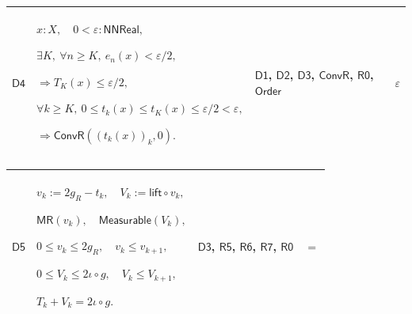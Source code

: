 \documentclass[11pt]{amsart}
\newlength{\FTCFourColumnBody}
\begin{document}
{\noindent
\begin{tabular}{|@{}>{\centering\arraybackslash}m{0.078431\FTCFourColumnBody}|>{\centering\arraybackslash}m{0.535947\FTCFourColumnBody}|>{\centering\arraybackslash}m{0.281045\FTCFourColumnBody}|>{\centering\arraybackslash}m{0.104575\FTCFourColumnBody}|}\hline
\hypertarget{dct:D4}{$\displaystyle \textsf{D4}$} & $\displaystyle x:X,\quad0<\varepsilon:\textsf{NNReal},$\par
$\displaystyle \exists K,\ \forall n\ge K,\ e_n(x)<\varepsilon/2,$\par
$\displaystyle \Rightarrow T_K(x)\le\varepsilon/2,$\par
$\displaystyle \forall k\ge K,\ 0\le t_k(x)\le t_K(x)\le\varepsilon/2<\varepsilon,$\par
$\displaystyle \Rightarrow\textsf{ConvR}((t_k(x))_k,0).$ & \hyperlink{dct:D1}{$\displaystyle \textsf{D1}$}, \hyperlink{dct:D2}{$\displaystyle \textsf{D2}$}, \hyperlink{dct:D3}{$\displaystyle \textsf{D3}$}, \hyperlink{dctdef:ConvR}{$\displaystyle \textsf{ConvR}$}, \hyperlink{dct:R0}{$\displaystyle \textsf{R0}$}, \hyperlink{ax:Order}{$\displaystyle \textsf{Order}$} & $\displaystyle \varepsilon$\\ \hline
\end{tabular}%
\par\setlength{\parskip}{0pt}\nointerlineskip
\noindent
\begin{tabular}{|@{}>{\centering\arraybackslash}m{0.078431\FTCFourColumnBody}|>{\centering\arraybackslash}m{0.535947\FTCFourColumnBody}|>{\centering\arraybackslash}m{0.281045\FTCFourColumnBody}|>{\centering\arraybackslash}m{0.104575\FTCFourColumnBody}|}\hline
\hypertarget{dct:D5}{$\displaystyle \textsf{D5}$} & $\displaystyle v_k:=2g_R-t_k,\quad V_k:=\textsf{lift}\circ v_k,$\par
$\displaystyle \textsf{MR}(v_k),\quad\textsf{Measurable}(V_k),$\par
$\displaystyle 0\le v_k\le2g_R,\quad v_k\le v_{k+1},$\par
$\displaystyle 0\le V_k\le2\iota\circ g,\quad V_k\le V_{k+1},$\par
$\displaystyle T_k+V_k=2\iota\circ g.$ & \hyperlink{dct:D3}{$\displaystyle \textsf{D3}$}, \hyperlink{dct:R5}{$\displaystyle \textsf{R5}$}, \hyperlink{dct:R6}{$\displaystyle \textsf{R6}$}, \hyperlink{dct:R7}{$\displaystyle \textsf{R7}$}, \hyperlink{dct:R0}{$\displaystyle \textsf{R0}$} & $\displaystyle =$\\ \hline
\end{tabular}%
\par\setlength{\parskip}{0pt}\nointerlineskip
}
\end{document}
